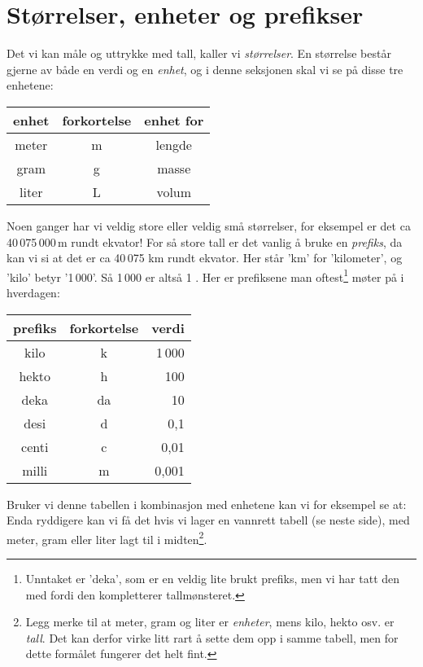 




\section{Størrelser, enheter og prefikser}
Det vi kan måle og uttrykke med tall, kaller vi \textit{størrelser}. En størrelse består gjerne av både en verdi og en \textit{enhet}, og i denne seksjonen skal vi se på disse tre enhetene:
\tbs
\begin{center}
	\begin{tabular}{c|c|c}
		\textbf{enhet} & \textbf{forkortelse} &\textbf{enhet for}\\ \hline
		meter & m &lengde\\\hline
		gram & g &masse\\\hline
		liter & L & volum
	\end{tabular}
\end{center}\tbs
Noen ganger har vi veldig store eller veldig små størrelser, for eksempel er det ca 40\,075\,000\,m rundt ekvator! For så store tall er det vanlig å bruke en \textit{prefiks}, da kan vi si at det er ca 40\,075 km rundt ekvator. Her står 'km' for 'kilometer', og 'kilo' betyr '1\,000'. Så 1\,000  er altså 1 . Her er prefiksene man oftest\footnote{Unntaket er 'deka', som er en veldig lite brukt prefiks, men vi har tatt den med fordi den kompletterer tallmønsteret.} møter på i hverdagen:\tbs
\begin{center}
	\begin{tabular}{c|c|r}
		\textbf{prefiks} & \textbf{forkortelse}&\textbf{verdi} \\ \hline
		kilo & k & 1\,000\phantom{000\;}\\\hline
		hekto & h & 100\phantom{000\;}\\\hline
		deka & da & 10\phantom{000\;}\\\hline
		desi & d & 0,1\phantom{0\,\;}\\\hline
		centi & c & 0,01\phantom{\,\;}\\\hline
		milli & m & 0,001\\\hline		
	\end{tabular}
\end{center}
Bruker vi denne tabellen i kombinasjon med enhetene kan vi for eksempel se at:\vs
{}
Enda ryddigere kan vi få det hvis vi lager en vannrett tabell (se neste side), med meter, gram eller liter lagt til i midten\footnote{Legg merke til at meter, gram og liter er \textsl{enheter}, mens kilo, hekto osv. er \textsl{tall}. Det kan derfor virke litt rart å sette dem opp i samme tabell, men for dette formålet fungerer det helt fint.}. 

